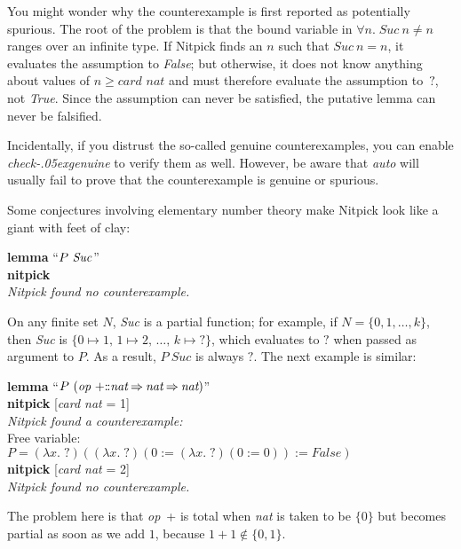 \documentclass[a4paper,12pt]{article}
\def\Colon{\mathord{:\mkern-1.5mu:}}
\def\unk{{?}}
\def\unkef{(\lambda x.\; \unk)}
\renewcommand\_{\hbox{\textunderscore\kern-.05ex}}
\begin{document}
You might wonder why the counterexample is first reported as potentially
spurious. The root of the problem is that the bound variable in $\forall n.\;
\textit{Suc}~n \mathbin{\not=} n$ ranges over an infinite type. If Nitpick finds
an $n$ such that $\textit{Suc}~n \mathbin{=} n$, it evaluates the assumption to
\textit{False}; but otherwise, it does not know anything about values of $n \ge
\textit{card~nat}$ and must therefore evaluate the assumption to~$\unk$, not
\textit{True}. Since the assumption can never be satisfied, the putative lemma
can never be falsified.

Incidentally, if you distrust the so-called genuine counterexamples, you can
enable \textit{check\_\allowbreak genuine} to verify them as well. However, be
aware that \textit{auto} will usually fail to prove that the counterexample is
genuine or spurious.

Some conjectures involving elementary number theory make Nitpick look like a
giant with feet of clay:

\prew
\textbf{lemma} ``$P~\textit{Suc\/}$'' \\
\textbf{nitpick} \\[2\smallskipamount]
\slshape
Nitpick found no counterexample.
\postw

On any finite set $N$, \textit{Suc} is a partial function; for example, if $N =
\{0, 1, \ldots, k\}$, then \textit{Suc} is $\{0 \mapsto 1,\, 1 \mapsto 2,\,
\ldots,\, k \mapsto \unk\}$, which evaluates to $\unk$ when passed as
argument to $P$. As a result, $P~\textit{Suc}$ is always $\unk$. The next
example is similar:

\prew
\textbf{lemma} ``$P~(\textit{op}~{+}\Colon
\textit{nat}\mathbin{\Rightarrow}\textit{nat}\mathbin{\Rightarrow}\textit{nat})$'' \\
\textbf{nitpick} [\textit{card nat} = 1] \\[2\smallskipamount]
{\slshape Nitpick found a counterexample:} \\[2\smallskipamount]
\hbox{}\qquad Free variable: \nopagebreak \\
\hbox{}\qquad\qquad $P = \unkef(\unkef(0 := \unkef(0 := 0)) := \mathit{False})$ \\[2\smallskipamount]
\textbf{nitpick} [\textit{card nat} = 2] \\[2\smallskipamount]
{\slshape Nitpick found no counterexample.}
\postw

The problem here is that \textit{op}~+ is total when \textit{nat} is taken to be
$\{0\}$ but becomes partial as soon as we add $1$, because
$1 + 1 \notin \{0, 1\}$.
\end{document}
